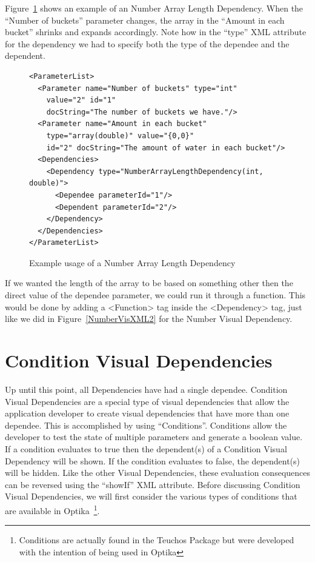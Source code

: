 Figure~\ref{ArrayLengthXML} shows an example of an Number Array Length Dependency. When the ``Number of buckets'' parameter changes, the array in the ``Amount
in each bucket'' shrinks and expands accordingly. Note how in the ``type'' XML attribute for the dependency we had to specify both the type of the dependee and the
dependent. 
\begin{figure}
\centering
{\footnotesize
\begin{Verbatim}
<ParameterList>
  <Parameter name="Number of buckets" type="int"
    value="2" id="1" 
    docString="The number of buckets we have."/>
  <Parameter name="Amount in each bucket" 
    type="array(double)" value="{0,0}"
    id="2" docString="The amount of water in each bucket"/>
  <Dependencies>
    <Dependency type="NumberArrayLengthDependency(int, double)">
      <Dependee parameterId="1"/>
      <Dependent parameterId="2"/>
    </Dependency>
  </Dependencies>
</ParameterList>
\end{Verbatim}
}
\caption{Example usage of a Number Array Length Dependency}
\label{ArrayLengthXML}
\end{figure}

If we wanted the length of the array to be based on something other then the direct value of the dependee parameter, we could run it through a function. This would 
be done by adding a <Function> tag inside the <Dependency> tag, just like we did in Figure~\ref{NumberVisXML2} for the Number Visual Dependency.

\section{Condition Visual Dependencies}
Up until this point, all Dependencies have had a single dependee. Condition Visual Dependencies are a special type of visual dependencies that allow the application developer to
create visual dependencies that have more than one dependee. This is accomplished by using ``Conditions''. Conditions allow the developer to test the state of multiple 
parameters and generate a boolean value. If a condition evaluates to true then the dependent(s) of a Condition Visual Dependency will be shown. If the condition evaluates to 
false, the dependent(s) will be hidden. Like the other Visual Dependencies, these evaluation consequences can be reversed using the ``showIf'' XML attribute.  Before discussing 
Condition Visual Dependencies, we will first consider the various types of conditions that are available in Optika~\footnote{Conditions are actually found in the Teuchos Package 
but were developed with the intention of being used in Optika}.


